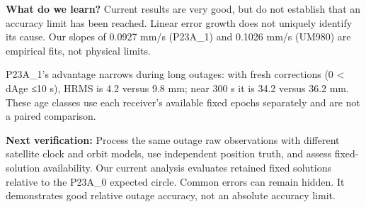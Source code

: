 \documentclass[11pt,a4paper]{article}
\numberwithin{equation}{section}
\numberwithin{figure}{section}
\begin{document}
\textbf{What do we learn?} Current results are very good, but do not establish that an accuracy limit has been reached. Linear error growth does not uniquely identify its cause. Our slopes of 0.0927 mm/\allowbreak{}s (P23A\_1) and 0.1026 mm/\allowbreak{}s (UM980) are empirical fits, not physical limits.

P23A\_1's advantage narrows during long outages: with fresh corrections (0 < dAge ≤10 s), HRMS is 4.2 versus 9.8 mm; near 300 s it is 34.2 versus 36.2 mm. These age classes use each receiver's available fixed epochs separately and are not a paired comparison.

\textbf{Next verification:} Process the same outage raw observations with different satellite clock and orbit models, use independent position truth, and assess fixed-solution availability. Our current analysis evaluates retained fixed solutions relative to the P23A\_0 expected circle. Common errors can remain hidden. It demonstrates good relative outage accuracy, not an absolute accuracy limit.
\end{document}
